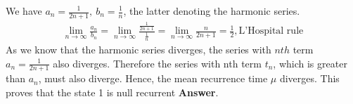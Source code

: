 We have $a_n = \frac{1}{2n+1}, \ b_n = \frac{1}{n}$, the latter denoting the harmonic series.
\begin{gather*}
\lim_{n\to\infty} \frac{a_n}{b_n} = \lim_{n\to\infty} \frac{\frac{1}{2n+1}}{\frac{1}{n}} = \lim_{n\to\infty} \frac{n}{2n+1} = \frac{1}{2}, \text{L'Hospital rule}
\end{gather*}
As we know that the harmonic series diverges, the series with $nth$ term $a_n = \frac{1}{2n+1}$ also diverges. Therefore the series with nth term $t_n$, which is greater than $a_n$, must also diverge. Hence, the mean recurrence time $\mu$ diverges. This proves that the state 1 is null recurrent \textbf{Answer}.